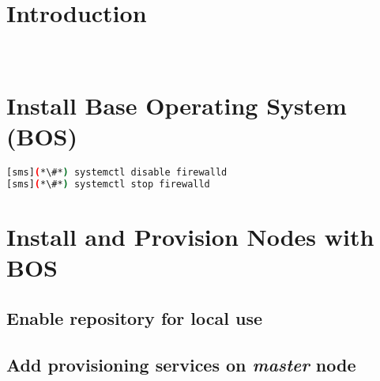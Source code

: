 \documentclass[letterpaper]{article}
\begin{document}
\graphicspath{{common/figures/}}
\thispagestyle{empty}




\newpage
\tableofcontents
\newpage


\section{Introduction} \label{sec:introduction}

 \\









\section{Install Base Operating System (BOS)}


\begin{lstlisting}[language=bash,keywords={}]
[sms](*\#*) systemctl disable firewalld
[sms](*\#*) systemctl stop firewalld
\end{lstlisting}


\section{Install \Confluent{} and Provision Nodes with BOS} \label{sec:provision_compute_bos}


\subsection{Enable \Confluent{} repository for local use} \label{sec:enable_confluent}


\subsection{Add provisioning services on {\em master} node} \label{sec:add_provisioning}

\end{document}
